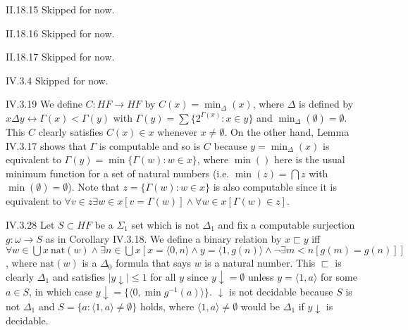 \documentclass[12pt]{article}
\begin{document}
\begin{customthm}{II.18.15}
  Skipped for now.
\end{customthm}

\begin{customthm}{II.18.16}
  Skipped for now.
\end{customthm}

\begin{customthm}{II.18.17}
  Skipped for now.
\end{customthm}

\begin{customthm}{IV.3.4}
  Skipped for now.
\end{customthm}

\begin{customthm}{IV.3.19}
  We define $C:HF\rightarrow HF$ by $C(x)=\min_\Delta(x)$, where $\Delta$ is defined by $x\Delta y\leftrightarrow\Gamma(x)<\Gamma(y)$ with $\Gamma(y)=\sum\{2^{\Gamma(x)}:x\in y\}$ and $\min_\Delta(\emptyset)=\emptyset$. This $C$ clearly satisfies $C(x)\in x$ whenever $x\neq\emptyset$. On the other hand, Lemma IV.3.17 shows that $\Gamma$ is computable and so is $C$ because $y=\min_\Delta(x)$ is equivalent to $\Gamma(y)=\min\{\Gamma(w):w\in x\}$, where $\min()$ here is the usual minimum function for a set of natural numbers (i.e. $\min(z)=\bigcap z$ with $\min(\emptyset)=\emptyset$). Note that $z=\{\Gamma(w):w\in x\}$ is also computable since it is equivalent to $\forall v\in z\exists w\in x[v=\Gamma(w)]\wedge\forall w\in x[\Gamma(w)\in z]$.
\end{customthm}

\begin{customthm}{IV.3.28}
  Let $S\subset HF$ be a $\Sigma_1$ set which is not $\Delta_1$ and fix a computable surjection $g:\omega\rightarrow S$ as in Corollary IV.3.18. We define a binary relation by $x\sqsubset y$ iff $\forall w\in\bigcup x~\mathrm{nat}(w)\wedge\exists n\in\bigcup x[x=\langle0,n\rangle\wedge y=\langle1,g(n)\rangle\wedge\neg\exists m<n[g(m)=g(n)]]$, where $\mathrm{nat}(w)$ is a $\Delta_0$ formula that says $w$ is a natural number. This $\sqsubset$ is clearly $\Delta_1$ and satisfies $|y\downarrow|\leq1$ for all $y$ since $y\downarrow=\emptyset$ unless $y=\langle1,a\rangle$ for some $a\in S$, in which case $y\downarrow=\{\langle0,\min g^{-1}(a)\rangle\}$. $\downarrow$ is not decidable because $S$ is not $\Delta_1$ and $S=\{a:\langle1,a\rangle\neq\emptyset\}$ holds, where $\langle1,a\rangle\neq\emptyset$ would be $\Delta_1$ if $y\downarrow$ is decidable.
\end{customthm}
\end{document}
